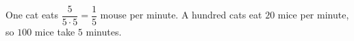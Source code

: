 One cat eats $\dfrac{5}{5\cdot5}=\dfrac{1}{5}$ mouse per minute. A hundred cats eat $20$ mice per minute, so $100$ mice take $\boxed5$ minutes.
